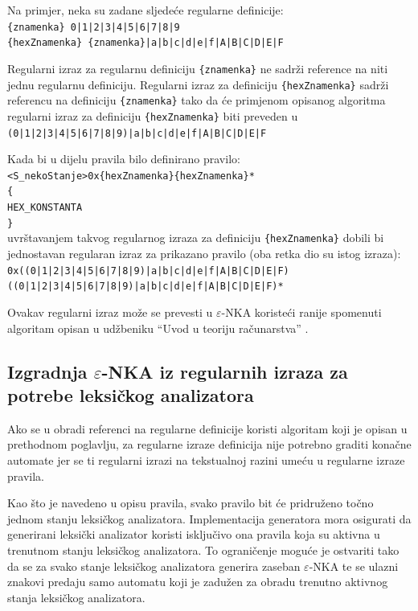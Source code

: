 \documentclass[times, 12pt, utf8]{book}
\begin{document}
Na primjer, neka su zadane sljedeće regularne definicije:\\
\verb={znamenka} 0|1|2|3|4|5|6|7|8|9=\\
\verb={hexZnamenka} {znamenka}|a|b|c|d|e|f|A|B|C|D|E|F=

Regularni izraz za regularnu definiciju \verb|{znamenka}| ne sadrži reference na niti jednu regularnu definiciju.
Regularni izraz za definiciju \verb|{hexZnamenka}| sadrži referencu na definiciju \verb|{znamenka}| tako da će primjenom opisanog algoritma regularni izraz za definiciju \verb|{hexZnamenka}| biti preveden u \verb=(0|1|2|3|4|5|6|7|8|9)|a|b|c|d|e|f|A|B|C|D|E|F=

Kada bi u dijelu pravila bilo definirano pravilo:\\
\verb=<S_nekoStanje>0x{hexZnamenka}{hexZnamenka}*=\\
\verb={=\\
\verb=HEX_KONSTANTA=\\
\verb=}=\\
uvrštavanjem takvog regularnog izraza za definiciju \verb|{hexZnamenka}| dobili bi jednostavan regularan izraz za prikazano pravilo (oba retka dio su istog izraza):\\
\verb=0x((0|1|2|3|4|5|6|7|8|9)|a|b|c|d|e|f|A|B|C|D|E|F)=\\
\verb=((0|1|2|3|4|5|6|7|8|9)|a|b|c|d|e|f|A|B|C|D|E|F)*=

Ovakav regularni izraz može se prevesti u \(\varepsilon\)-NKA koristeći ranije spomenuti algoritam opisan u udžbeniku ``Uvod u teoriju računarstva'' \cite[poglavlje 2.2.2]{utr}.

\subsection{Izgradnja $\varepsilon$-NKA iz regularnih izraza za potrebe leksičkog analizatora}
Ako se u obradi referenci na regularne definicije koristi algoritam koji je opisan u prethodnom poglavlju, za regularne izraze definicija nije potrebno graditi konačne automate jer se ti regularni izrazi na tekstualnoj razini umeću u regularne izraze pravila.

Kao što je navedeno u opisu pravila, svako pravilo bit će pridruženo točno jednom stanju leksičkog analizatora.
Implementacija generatora mora osigurati da generirani leksički analizator koristi isključivo ona pravila koja su aktivna u trenutnom stanju leksičkog analizatora.
To ograničenje moguće je ostvariti tako da se za svako stanje leksičkog analizatora generira zaseban \(\varepsilon\)-NKA te se ulazni znakovi predaju samo automatu koji je zadužen za obradu trenutno aktivnog stanja leksičkog analizatora.
\end{document}
